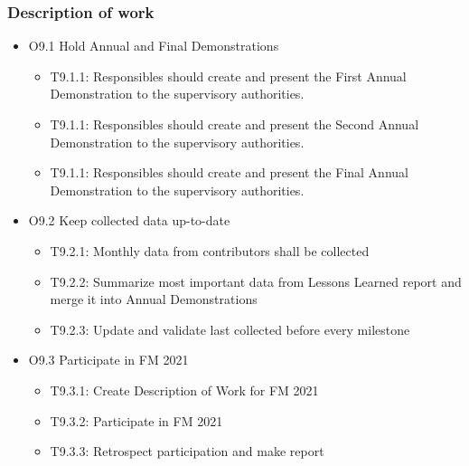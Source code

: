 \subsubsection{Description of work}
\begin{itemize}
	\item O9.1 Hold Annual and Final Demonstrations
	\begin{itemize}
		\item T9.1.1: Responsibles should create and present the First Annual Demonstration to the supervisory authorities.   
		\item T9.1.1: Responsibles should create and present the Second Annual Demonstration to the supervisory authorities.
		\item T9.1.1: Responsibles should create and present the Final Annual Demonstration to the supervisory authorities.
	\end{itemize}
	\item O9.2 Keep collected data up-to-date
	\begin{itemize}
		 \item T9.2.1: Monthly data from contributors shall be collected
		 \item T9.2.2: Summarize most important data from Lessons Learned report and merge it into Annual Demonstrations
		 \item T9.2.3: Update and validate last collected before every milestone  
	\end{itemize}
	\item O9.3 Participate in FM 2021
	\begin{itemize}
		 \item T9.3.1: Create Description of Work for FM 2021
		 \item T9.3.2: Participate in FM 2021
		 \item T9.3.3: Retrospect participation and make report
	\end{itemize}
\end{itemize}

